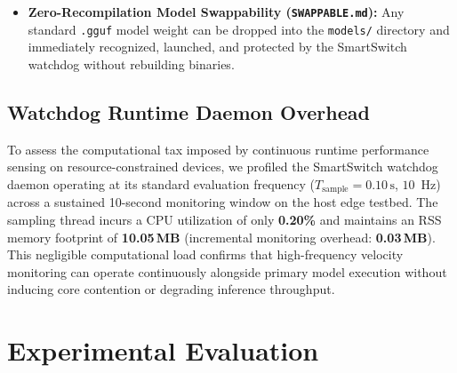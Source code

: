 \documentclass[11pt,a4paper]{article}
\newcommand{\su}{\,\mathrm{s}}
\newcommand{\code}[1]{\texttt{#1}}
\begin{document}
\begin{itemize}[leftmargin=*]
\begin{enumerate}[leftmargin=1.5em]
    \item \emph{Observation Window Capping (\code{max\_obs\_chars = 800}):} Truncates long terminal or file outputs to 800 characters, preventing tool observations from exhausting the small model's narrow context window.
    \item \emph{Dynamic Runtime Error Reflection:} If a tool invocation fails (e.g., malformed path or syntax error), the exact runtime traceback is injected back into the prompt (\emph{``Error: ... Please reflect on this error and adjust arguments''}), enabling the small model to self-correct in the subsequent reasoning step.
    \item \emph{Compact Tool Signatures:} Replaces 800+ tokens of raw file comments with concise 60-token functional declarations, saving $>90\%$ of context capacity for agent reasoning.
  \end{enumerate}
  \item \textbf{Zero-Recompilation Model Swappability (\code{SWAPPABLE.md}):} Any standard \code{.gguf} model weight can be dropped into the \code{models/} directory and immediately recognized, launched, and protected by the SmartSwitch watchdog without rebuilding binaries.
\end{itemize}

\subsection{Watchdog Runtime Daemon Overhead}\label{sec:daemon_overhead}
To assess the computational tax imposed by continuous runtime performance sensing on resource-constrained devices, we profiled the SmartSwitch watchdog daemon operating at its standard evaluation frequency ($T_{\mathrm{sample}} = 0.10\su$, $10$~Hz) across a sustained 10-second monitoring window on the host edge testbed. The sampling thread incurs a CPU utilization of only \textbf{0.20\%} and maintains an RSS memory footprint of \textbf{10.05\,MB} (incremental monitoring overhead: \textbf{0.03\,MB}). This negligible computational load confirms that high-frequency velocity monitoring can operate continuously alongside primary model execution without inducing core contention or degrading inference throughput.

\section{Experimental Evaluation}\label{sec:eval}
\end{document}
